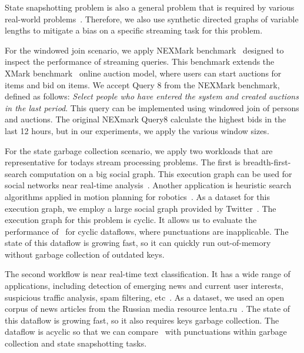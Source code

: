 State snapshotting problem is also a general problem that is required by various real-world problems~\cite{Carbone:2017:SMA:3137765.3137777}. Therefore, we also use synthetic directed graphs of variable lengths to mitigate a bias on a specific streaming task for this problem. 

For the windowed join scenario, we apply NEXMark benchmark~\cite{tucker2008nexmark} designed to inspect the performance of streaming queries. This benchmark extends the XMark benchmark~\cite{schmidt2002xmark} online auction model, where users can start auctions for items and bid on items. We accept Query 8 from the NEXMark benchmark, defined as follows: {\em Select people who have entered the system and created auctions in the last period}. This query can be implemented using windowed join of persons and auctions. The original NEXmark Query8 calculate the highest bids in the last 12 hours, but in our experiments, we apply the various window sizes.

For the state garbage collection scenario, we apply two workloads that are representative for todays stream processing problems. The first is breadth-first-search computation on a big social graph. This execution graph can be used for social networks near real-time analysis~\cite{wang2011understanding}. Another application is heuristic search algorithms applied in motion planning for robotics~\cite{sud2007real}. As a dataset for this execution graph, we employ a large social graph provided by Twitter~\cite{kwak2010twitter}. The execution graph for this problem is cyclic. It allows us to evaluate the performance of \tracker\ for cyclic dataflows, where punctuations are inapplicable. The state of this dataflow is growing fast, so it can quickly run out-of-memory without garbage collection of outdated keys.

The second workflow is near real-time text classification. It has a wide range of applications, including detection of emerging news and current user interests, suspicious traffic analysis, spam filtering, etc~\cite{webirte}. As a dataset, we used an open corpus of news articles from the Russian media resource lenta.ru~\cite{lentaru}. The state of this dataflow is growing fast, so it also requires keys garbage collection. The dataflow is acyclic so that we can compare \tracker\ with punctuations within garbage collection and state snapshotting tasks.


